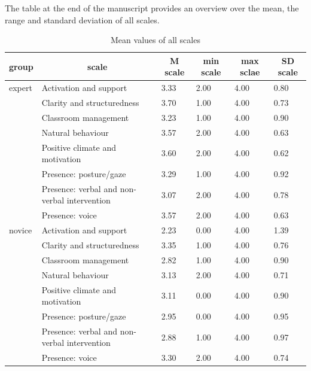 \documentclass[
  english,
  man,floatsintext]{apa6}
\begin{document}
The table at the end of the manuscript provides an overview over the mean, the range and standard deviation of all scales.

\begin{table}[h]

\begin{center}
\begin{threeparttable}

\caption{\label{tab:table all scales}Mean values of all scales}

\small{

\begin{tabular}{llllll}
\toprule
group & \multicolumn{1}{c}{scale} & \multicolumn{1}{c}{M scale} & \multicolumn{1}{c}{min scale} & \multicolumn{1}{c}{max sclae} & \multicolumn{1}{c}{SD scale}\\
\midrule
expert & Activation and support & 3.33 & 2.00 & 4.00 & 0.80\\
 & Clarity and structuredness & 3.70 & 1.00 & 4.00 & 0.73\\
 & Classroom management & 3.23 & 1.00 & 4.00 & 0.90\\
 & Natural behaviour & 3.57 & 2.00 & 4.00 & 0.63\\
 & Positive climate and motivation & 3.60 & 2.00 & 4.00 & 0.62\\
 & Presence: posture/gaze & 3.29 & 1.00 & 4.00 & 0.92\\
 & Presence: verbal and non-verbal intervention & 3.07 & 2.00 & 4.00 & 0.78\\
 & Presence: voice & 3.57 & 2.00 & 4.00 & 0.63\\
novice & Activation and support & 2.23 & 0.00 & 4.00 & 1.39\\
 & Clarity and structuredness & 3.35 & 1.00 & 4.00 & 0.76\\
 & Classroom management & 2.82 & 1.00 & 4.00 & 0.90\\
 & Natural behaviour & 3.13 & 2.00 & 4.00 & 0.71\\
 & Positive climate and motivation & 3.11 & 0.00 & 4.00 & 0.90\\
 & Presence: posture/gaze & 2.95 & 0.00 & 4.00 & 0.95\\
 & Presence: verbal and non-verbal intervention & 2.88 & 1.00 & 4.00 & 0.97\\
 & Presence: voice & 3.30 & 2.00 & 4.00 & 0.74\\
\bottomrule
\end{tabular}

}

\end{threeparttable}
\end{center}

\end{table}
\end{document}
